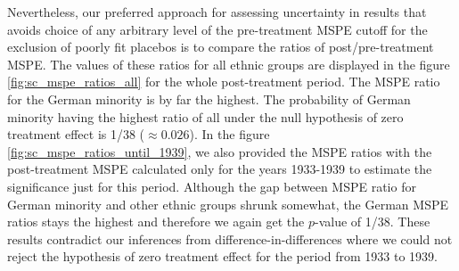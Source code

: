 Nevertheless, our preferred approach for assessing uncertainty in results that avoids  choice of any arbitrary level of the pre-treatment MSPE cutoff for the exclusion of poorly fit  placebos
is to compare the ratios of  post/pre-treatment MSPE. 
The values of these ratios for all ethnic groups are displayed in the figure \ref{fig:sc_mspe_ratios_all} for the whole post-treatment period. The MSPE ratio for the German minority is by far the highest. The probability of German minority having the highest ratio of all under the null hypothesis of zero treatment effect is 1/38 ($\approx 0.026$). 
In the figure \ref{fig:sc_mspe_ratios_until_1939}, we also provided the MSPE ratios  with the post-treatment MSPE calculated only for the years 
1933-1939  to estimate the significance just for this period. Although the gap between  MSPE ratio for German minority and other ethnic groups shrunk somewhat, the German MSPE ratios stays the highest and therefore we again get the  $p$-value of 1/38. 
These results contradict our inferences from difference-in-differences  where we could not reject the hypothesis of zero treatment effect for the period from 1933 to 1939. 


